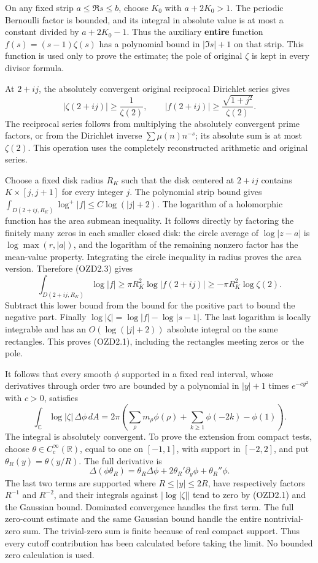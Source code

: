 On any fixed strip \(a\le\Re s\le b\), choose \(K_0\) with \(a+2K_0>1\).
The periodic Bernoulli factor is bounded, and its integral in absolute
value is at most a constant divided by \(a+2K_0-1\). Thus the auxiliary
\textbf{entire} function \(f(s)=(s-1)\zeta(s)\) has a polynomial bound
in \(|\Im s|+1\) on that strip. This function is used only to prove the
estimate; the pole of original \(\zeta\) is kept in every divisor
formula.

At \(2+ij\), the absolutely convergent original reciprocal Dirichlet
series gives \[
|\zeta(2+ij)|\ge\frac1{\zeta(2)},\qquad
|f(2+ij)|\ge\frac{\sqrt{1+j^2}}{\zeta(2)}.
\tag{OZD2.3}
\] The reciprocal series follows from multiplying the absolutely
convergent prime factors, or from the Dirichlet inverse
\(\sum\mu(n)n^{-s}\); its absolute sum is at most \(\zeta(2)\). This
operation uses the completely reconstructed arithmetic and original
series.

Choose a fixed disk radius \(R_K\) such that the disk centered at
\(2+ij\) contains \(K\times[j,j+1]\) for every integer \(j\). The
polynomial strip bound gives
\(\int_{D(2+ij,R_K)}\log^+|f|\le C\log(|j|+2)\). The logarithm of a
holomorphic function has the area submean inequality. It follows
directly by factoring the finitely many zeros in each smaller closed
disk: the circle average of \(\log|z-a|\) is \(\log\max(r,|a|)\), and
the logarithm of the remaining nonzero factor has the mean-value
property. Integrating the circle inequality in radius proves the area
version. Therefore (OZD2.3) gives \[
\int_{D(2+ij,R_K)}\log|f|\ge
\pi R_K^2\log|f(2+ij)|\ge-\pi R_K^2\log\zeta(2).
\] Subtract this lower bound from the bound for the positive part to
bound the negative part. Finally \(\log|\zeta|=\log|f|-\log|s-1|\). The
last logarithm is locally integrable and has an \(O(\log(|j|+2))\)
absolute integral on the same rectangles. This proves (OZD2.1),
including the rectangles meeting zeros or the pole.

It follows that every smooth \(\phi\) supported in a fixed real
interval, whose derivatives through order two are bounded by a
polynomial in \(|y|+1\) times \(e^{-c y^2}\) with \(c>0\), satisfies \[
\int_{\mathbb C}\log|\zeta|\,\Delta\phi\,dA
=2\pi\left(\sum_\rho m_\rho\phi(\rho)
+\sum_{k\ge1}\phi(-2k)-\phi(1)\right).
\tag{OZD2.4}
\] The integral is absolutely convergent. To prove the extension from
compact tests, choose \(\theta\in C_c^\infty(\mathbb R)\), equal to one
on \([-1,1]\), with support in \([-2,2]\), and put
\(\theta_R(y)=\theta(y/R)\). The full derivative is \[
\Delta(\phi\theta_R)=\theta_R\Delta\phi
+2\theta_R'\partial_y\phi+\theta_R''\phi.
\tag{OZD2.5}
\] The last two terms are supported where \(R\le|y|\le2R\), have
respectively factors \(R^{-1}\) and \(R^{-2}\), and their integrals
against \(|\log|\zeta||\) tend to zero by (OZD2.1) and the Gaussian
bound. Dominated convergence handles the first term. The full zero-count
estimate and the same Gaussian bound handle the entire nontrivial-zero
sum. The trivial-zero sum is finite because of real compact support.
Thus every cutoff contribution has been calculated before taking the
limit. No bounded zero calculation is used.

